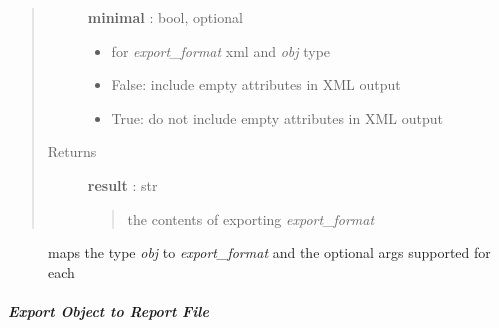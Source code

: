 \documentclass[letterpaper,10pt,english]{sphinxmanual}
\begin{document}
\begin{fulllineitems}
\begin{quote}
\begin{description}
\begin{itemize}
\end{itemize}

\textbf{minimal} : bool, optional
\begin{itemize}
\item {} 
for \emph{export\_format} xml and \emph{obj} type {\hyperref[taniumpy.object_types:taniumpy.object_types.base.BaseType]{}}

\item {} 
False: include empty attributes in XML output

\item {} 
True: do not include empty attributes in XML output

\end{itemize}

\item[{Returns}] \leavevmode
\textbf{result} : str
\begin{quote}

the contents of exporting \emph{export\_format}
\end{quote}

\end{description}\end{quote}



\begin{description}
\item[{{\hyperref[pytan.constants:pytan.constants.EXPORT_MAPS]{}}}] \leavevmode
maps the type \emph{obj} to \emph{export\_format} and the optional args supported for each

\end{description}



\end{fulllineitems}



\subparagraph{Export Object to Report File}
\label{pytan.handler:export-object-to-report-file}
\end{document}
